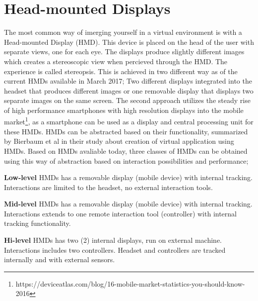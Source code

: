 \section{Head-mounted Displays}
\label{theory:HMD}
The most common way of imerging yourself in a virtual environment is with a Head-mounted Display (HMD). This device is placed on the head of the user with separate views, one for each eye. The displays produce slightly different images which creates a stereoscopic view when percieved through the HMD. The experience is called stereopsis\cite{HMD:goldstein2016sensation}. This is achieved in two different way as of the current HMDs available in March 2017; Two different displays integrated into the headset that produces different images or one removable display that displays two separate images on the same screen. The second approach utilizes the steady rise of high performance smartphones with high resolution displays into the mobile market\footnote{https://deviceatlas.com/blog/16-mobile-market-statistics-you-should-know-2016}, as a smartphone can be used as a display and central processing unit for these HMDs.
HMDs can be abstracted based on their functionality, summarized by Bierbaum et al in their study about creation of virtual application using HMDs\cite{HMD:bierbaum2001vr}. Based on HMDs avaliable today, three classes of HMDs can be obtained using this way of abstraction based on interaction possibilities and performance;

\textbf{Low-level} HMDs has a removable display (mobile device) with internal tracking. Interactions are limited to the headset, no external interaction tools.

\textbf{Mid-level} HMDs has a removable display (mobile device) with internal tracking. Interactions extends to one remote interaction tool (controller) with internal tracking functionality.

\textbf{Hi-level} HMDs has two (2) internal displays, run on external machine. Interactions includes two controllers. Headset and controllers are tracked internally and with external sensors.
